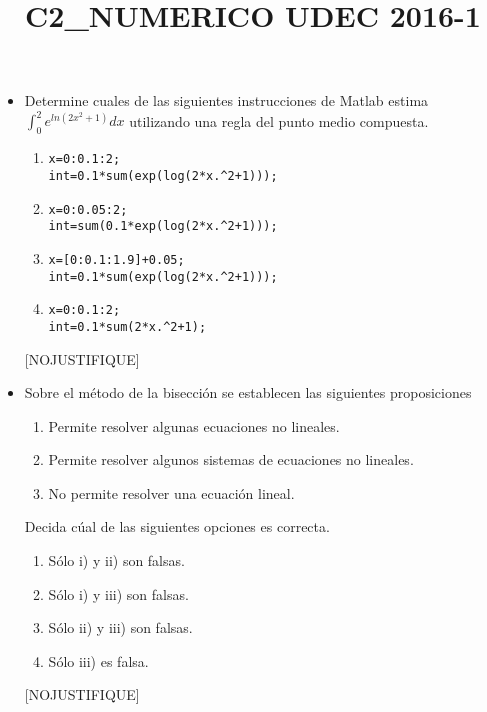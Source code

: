 \documentclass[11pt]{article}
\newcommand{\buena}{[BUENA]}
\newcommand{\nojustifique}{[NOJUSTIFIQUE]}
\begin{document}
\title{C2_NUMERICO UDEC 2016-1}
\begin{itemize}

\item Determine cuales de las siguientes instrucciones de Matlab estima $\int_0^2 e^{ln(2x^2+1)} dx$ utilizando una regla del punto medio compuesta.
\begin{enumerate} 
\item
\begin{lstlisting}
x=0:0.1:2;
int=0.1*sum(exp(log(2*x.^2+1)));
\end{lstlisting}

\item
\begin{lstlisting}
x=0:0.05:2;
int=sum(0.1*exp(log(2*x.^2+1)));
\end{lstlisting}

\item \buena
\begin{lstlisting}
x=[0:0.1:1.9]+0.05;
int=0.1*sum(exp(log(2*x.^2+1)));
\end{lstlisting}

\item
\begin{lstlisting}
x=0:0.1:2;
int=0.1*sum(2*x.^2+1);
\end{lstlisting}
\end{enumerate}
\nojustifique 

\item Sobre el m\'etodo de la bisecci\'on se establecen las siguientes proposiciones
\begin{enumerate}
	\item Permite resolver algunas ecuaciones no lineales.
    \item Permite resolver algunos sistemas de ecuaciones no lineales.
    \item No permite resolver una ecuaci\'on lineal.
\end{enumerate}
Decida c\'ual de las siguientes opciones es correcta.
\begin{enumerate}
	\item Sólo i) y ii) son falsas.
    \item Sólo i) y iii) son falsas.
    \item \buena Sólo ii) y iii) son falsas.
    \item Sólo iii) es falsa.
\end{enumerate}
\nojustifique 


\end{itemize}
\end{document}
